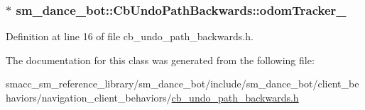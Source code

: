 \subsubsection[{\texorpdfstring{odom\+Tracker\+\_\+}{odomTracker_}}]{$\ast$ sm\+\_\+dance\+\_\+bot\+::\+Cb\+Undo\+Path\+Backwards\+::odom\+Tracker\+\_\+\hspace{0.3cm}{\ttfamily [private]}}\hypertarget{classsm__dance__bot_1_1CbUndoPathBackwards_a51cc8ec7a7e9da1f3cb4c1816b382af9}{}\label{classsm__dance__bot_1_1CbUndoPathBackwards_a51cc8ec7a7e9da1f3cb4c1816b382af9}


Definition at line 16 of file cb\+\_\+undo\+\_\+path\+\_\+backwards.\+h.



The documentation for this class was generated from the following file\+:\begin{DoxyCompactItemize}
\item 
smacc\+\_\+sm\+\_\+reference\+\_\+library/sm\+\_\+dance\+\_\+bot/include/sm\+\_\+dance\+\_\+bot/client\+\_\+behaviors/navigation\+\_\+client\+\_\+behaviors/\hyperlink{cb__undo__path__backwards_8h}{cb\+\_\+undo\+\_\+path\+\_\+backwards.\+h}\end{DoxyCompactItemize}
